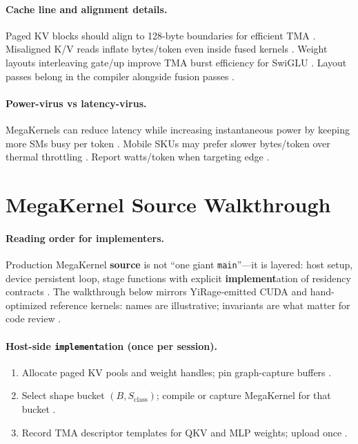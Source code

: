 \paragraph{Cache line and alignment details.} Paged KV blocks should align to 128-byte boundaries for efficient TMA \citep{semianalysis2024tma,nvidia2022hopper}. Misaligned K/V reads inflate bytes/token even inside fused kernels \citep{memoryfloor2026,kwon2023vllm}. Weight layouts interleaving gate/up improve TMA burst efficiency for SwiGLU \citep{patel2025llminference,yirage2026}. Layout passes belong in the compiler alongside fusion passes \citep{chen2020compilerbasedhardw,liu2024deepseekv3}.

\paragraph{Power-virus vs latency-virus.} MegaKernels can reduce latency while increasing instantaneous power by keeping more SMs busy per token \citep{patel2025llminference,amd2024aie}. Mobile SKUs may prefer slower bytes/token over thermal throttling \citep{amd2024xdna,dlbook}. Report watts/token when targeting edge \citep{amd2024aie,memoryfloor2026}.

\section{MegaKernel Source Walkthrough}
\label{sec:ch11_source_walkthrough}

\paragraph{Reading order for implementers.} Production MegaKernel \textbf{source} is not ``one giant \texttt{main}''---it is layered: host setup, device persistent loop, stage functions with explicit \textbf{implement}ation of residency contracts \citep{chen2020compilerbasedhardw,nvidia2024cudagraphs}. The walkthrough below mirrors YiRage-emitted CUDA and hand-optimized reference kernels: names are illustrative; invariants are what matter for code review \citep{yirage2026}.

\paragraph{Host-side \texttt{implement}ation (once per session).}
\begin{enumerate}
\item Allocate paged KV pools and weight handles; pin graph-capture buffers \citep{kwon2023vllm,nvidia2024cudagraphs}.
\item Select shape bucket $(B,S_{\mathrm{class}})$; compile or capture MegaKernel for that bucket \citep{yirage2026,amd2024xdna}.
\item Record TMA descriptor templates for QKV and MLP weights; upload once \citep{semianalysis2024tma,nvidia2022hopper}.
\end{enumerate}

